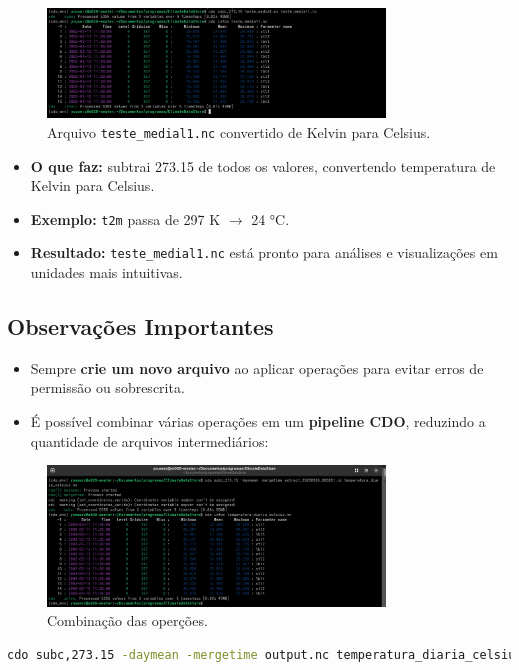 \documentclass[12pt, a4paper]{article}
\begin{document}
\begin{figure}[h!]
    \centering
    \includegraphics[width=0.8\textwidth]{3.png}
    \caption{Arquivo \texttt{teste\_medial1.nc} convertido de Kelvin para Celsius.}
    \label{fig:subc}
\end{figure}

\begin{itemize}
    \item \textbf{O que faz:} subtrai 273.15 de todos os valores, convertendo temperatura de Kelvin para Celsius.
    \item \textbf{Exemplo:} \texttt{t2m} passa de 297 K $\to$ 24 °C.
    \item \textbf{Resultado:} \texttt{teste\_medial1.nc} está pronto para análises e visualizações em unidades mais intuitivas.
\end{itemize}

\subsection{Observações Importantes}

\begin{itemize}
    \item Sempre \textbf{crie um novo arquivo} ao aplicar operações para evitar erros de permissão ou sobrescrita.
    \item É possível combinar várias operações em um \textbf{pipeline CDO}, reduzindo a quantidade de arquivos intermediários:
\end{itemize}
\begin{figure}[h!]
    \centering
    \includegraphics[width=0.8\textwidth]{4.png}
    \caption{Combinação das operções.}
    \label{fig:subc}
\end{figure}
\begin{lstlisting}[language=bash]
cdo subc,273.15 -daymean -mergetime output.nc temperatura_diaria_celsius.nc
\end{lstlisting}
\end{document}
